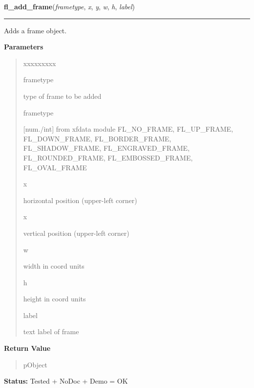 \hspace{.8\funcindent}\begin{boxedminipage}{\funcwidth}

    \raggedright \textbf{fl\_add\_frame}(\textit{frametype}, \textit{x}, \textit{y}, \textit{w}, \textit{h}, \textit{label})

    \vspace{-1.5ex}

    \rule{\textwidth}{0.5\fboxrule}
\setlength{\parskip}{2ex}
    Adds a frame object.

\setlength{\parskip}{1ex}
      \textbf{Parameters}
      \vspace{-1ex}

      \begin{quote}
        \begin{Ventry}{xxxxxxxxx}

          \item[frametype]

          type of frame to be added

          \item[frametype]

          [num./int] from xfdata module FL\_NO\_FRAME, FL\_UP\_FRAME, 
          FL\_DOWN\_FRAME, FL\_BORDER\_FRAME, FL\_SHADOW\_FRAME, 
          FL\_ENGRAVED\_FRAME, FL\_ROUNDED\_FRAME, FL\_EMBOSSED\_FRAME, 
          FL\_OVAL\_FRAME

          \item[x]

          horizontal position (upper-left corner)

          \item[x]

          vertical position (upper-left corner)

          \item[w]

          width in coord units

          \item[h]

          height in coord units

          \item[label]

          text label of frame

        \end{Ventry}

      \end{quote}

      \textbf{Return Value}
    \vspace{-1ex}

      \begin{quote}
      pObject

      \end{quote}

\textbf{Status:} Tested + NoDoc + Demo = OK



    \end{boxedminipage}

